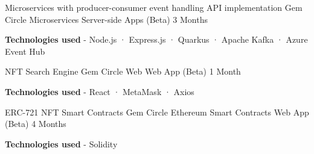 \begin{cventries}
{\begin{cvitems}
      \end{cvitems}
    }
  \cventry
    {Microservices with producer-consumer event handling API implementation} %
    {Gem Circle Microservices} %
    {Server-side Apps (Beta)} %
    {3 Months} %
    {
      \begin{cvitems} %
        \item {\textbf{Technologies used} \hspace{0.03cm} - \hspace{0.03cm} Node.js \hspace{0.03cm} · \hspace{0.03cm} Express.js \hspace{0.03cm} · \hspace{0.03cm} Quarkus \hspace{0.03cm} · \hspace{0.03cm} Apache Kafka \hspace{0.03cm} · \hspace{0.03cm} Azure Event Hub \\}
      \end{cvitems}
    }
  \cventry
    {NFT Search Engine} %
    {Gem Circle Web} %
    {Web App (Beta)} %
    {1 Month} %
    {
      \begin{cvitems} %
        \item {\textbf{Technologies used} \hspace{0.03cm} - \hspace{0.03cm} React \hspace{0.03cm} · \hspace{0.03cm} MetaMask \hspace{0.03cm} · \hspace{0.03cm} Axios \\}
      \end{cvitems}
    }
  \cventry
    {ERC-721 NFT Smart Contracts} %
    {Gem Circle Ethereum Smart Contracts} %
    {Web App (Beta)} %
    {4 Months} %
    {
      \begin{cvitems} %
        \item {\textbf{Technologies used} \hspace{0.03cm} - \hspace{0.03cm} Solidity \\}

\end{cvitems}}
\end{cventries}
